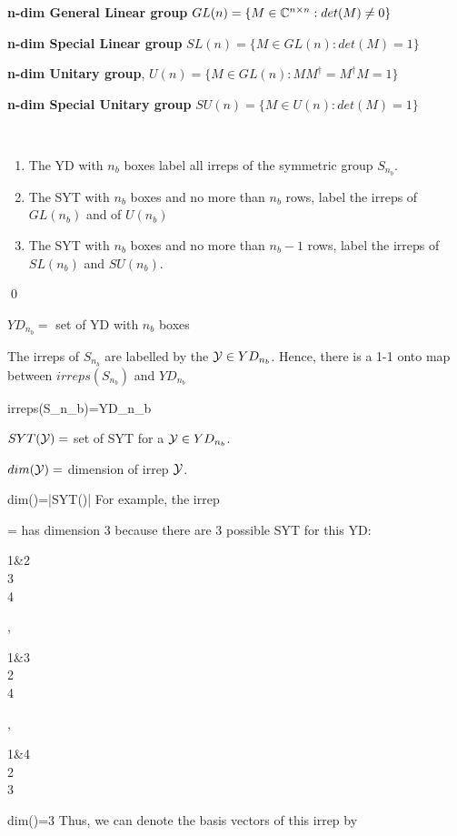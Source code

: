 {\bf n-dim General   Linear group} $GL(n)=\{ M\in{ \mathbb{C}}^{n\times n}:
det(M)\neq 0\}$

{\bf n-dim Special Linear group} $SL(n)=\{ M\in GL(n):
det(M)=1\}$

{\bf n-dim Unitary group}, $U(n)=\{ M\in GL(n):
M M^\dagger =M^\dagger M =1\}$

{\bf n-dim Special Unitary group}
$SU(n)=\{ M\in U(n):
det(M)=1\}$


\begin{claim}\
\begin{enumerate}
\item
The YD with $n_b$ boxes label all irreps of the symmetric group 
$S_{n_b}$.

\item
The SYT with $n_b$ boxes and no more than $n_b$ rows,
label the irreps of $GL(n_b)$ and of $U(n_b)$
\item
The SYT with $n_b$ boxes and
no more than $n_b-1$
rows, label the irreps of $SL(n_b)$ and $SU(n_b)$.
\end{enumerate}
\end{claim}
\proof
\qed



$YD_{n_b}=$ set of YD with $n_b$ boxes

The irreps of $S_{n_b}$  are labelled by the ${\cal Y}\in YD_{n_b}$. 
Hence, there is a 1-1 onto map between $irreps(S_{n_b})$ and $YD_{n_b}$


\beq
irreps(S_{n_b})=YD_{n_b}
\eeq


$SYT({\cal Y})=$ set of SYT for a ${\cal Y}\in YD_{n_b}$.


$dim({\cal Y})=$ dimension of irrep ${\cal Y}$.

\beq
dim(\caly)=|SYT(\caly)|
\eeq
For example, the 
irrep 

\beq
\caly=
\eeq
has dimension 3 because there are 3 possible SYT for this YD:

\beq
\begin{ytableau}
1&2
\\
3
\\
4
\end{ytableau}
,\quad
\begin{ytableau}
1&3
\\
2
\\
4
\end{ytableau}
,\quad
\begin{ytableau}
1&4
\\
2
\\
3
\end{ytableau}
\implies dim(\caly)=3
\eeq
Thus, we can denote the
basis vectors of this irrep by

